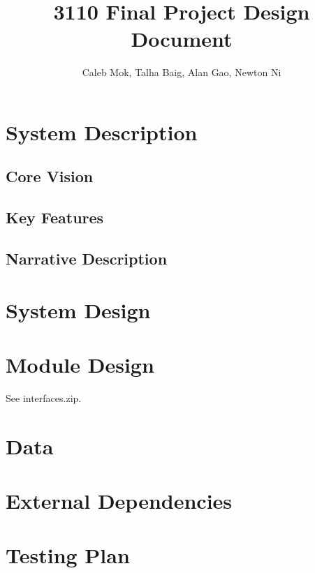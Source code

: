 \documentclass{article}
\author{Caleb Mok, Talha Baig, Alan Gao, Newton Ni}
\title{3110 Final Project Design Document}
\begin{document}
\maketitle

    \section{System Description}

        \subsection{Core Vision}

        \subsection{Key Features}

        \subsection{Narrative Description}

    \section{System Design}

        \subsection{}

    \section{Module Design}

        See interfaces.zip.

    \section{Data}

        
    \section{External Dependencies}

            

    \section{Testing Plan}
\end{document}
